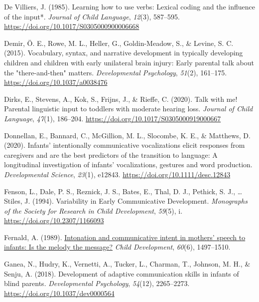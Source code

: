 \documentclass[
  man,floatsintext]{apa6}
\newlength{\cslhangindent}
\newlength{\cslentryspacingunit} %
\newenvironment{CSLReferences}[2] %
 {%
  \setlength{\parindent}{0pt}
  \ifodd #1
  \let\oldpar\par
  \def\par{\hangindent=\cslhangindent\oldpar}
  \fi
  \setlength{\parskip}{#2\cslentryspacingunit}
 }%
 {}
\begin{document}
\begin{CSLReferences}{1}{0}
\leavevmode{}%
De Villiers, J. (1985). Learning how to use verbs: Lexical coding and the influence of the input*. \emph{Journal of Child Language}, \emph{12}(3), 587--595. \url{https://doi.org/10.1017/S0305000900006668}

\leavevmode{}%
Demir, Ö. E., Rowe, M. L., Heller, G., Goldin-Meadow, S., \& Levine, S. C. (2015). Vocabulary, syntax, and narrative development in typically developing children and children with early unilateral brain injury: Early parental talk about the "there-and-then" matters. \emph{Developmental Psychology}, \emph{51}(2), 161--175. \url{https://doi.org/10.1037/a0038476}

\leavevmode{}%
Dirks, E., Stevens, A., Kok, S., Frijns, J., \& Rieffe, C. (2020). Talk with me! {Parental} linguistic input to toddlers with moderate hearing loss. \emph{Journal of Child Language}, \emph{47}(1), 186--204. \url{https://doi.org/10.1017/S0305000919000667}

\leavevmode{}%
Donnellan, E., Bannard, C., McGillion, M. L., Slocombe, K. E., \& Matthews, D. (2020). Infants' intentionally communicative vocalizations elicit responses from caregivers and are the best predictors of the transition to language: {A} longitudinal investigation of infants' vocalizations, gestures and word production. \emph{Developmental Science}, \emph{23}(1), e12843. \url{https://doi.org/10.1111/desc.12843}

\leavevmode{}%
Fenson, L., Dale, P. S., Reznick, J. S., Bates, E., Thal, D. J., Pethick, S. J., \ldots{} Stiles, J. (1994). Variability in {Early Communicative Development}. \emph{Monographs of the Society for Research in Child Development}, \emph{59}(5), i. \url{https://doi.org/10.2307/1166093}

\leavevmode{}%
Fernald, A. (1989). \href{https://www.ncbi.nlm.nih.gov/pubmed/2612255}{Intonation and communicative intent in mothers' speech to infants: Is the melody the message?} \emph{Child Development}, \emph{60}(6), 1497--1510.

\leavevmode{}%
Ganea, N., Hudry, K., Vernetti, A., Tucker, L., Charman, T., Johnson, M. H., \& Senju, A. (2018). Development of adaptive communication skills in infants of blind parents. \emph{Developmental Psychology}, \emph{54}(12), 2265--2273. \url{https://doi.org/10.1037/dev0000564}


\end{CSLReferences}
\end{document}
